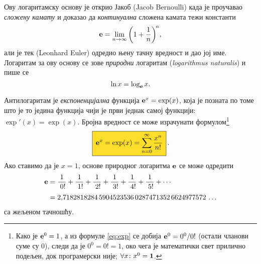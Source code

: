 Ову логаритамску основу је открио Јакоб  (Jacob Bernoulli) када је
проучавао {\sl сложену камату\/} и доказао да {\sl континуална\/} сложена камата
тежи константи
\begin{equation}\label{eq:elim}
\e=\lim_{n\to\infty}\left(1+\frac1n\right)^{\!n}\!,\index{лимес}
\end{equation}
али је тек  (Leonhard Euler)
одредио њену тачну вредност и дао јој име.
Логаритам за ову основу се зове
{\sl природни\/} логаритам ({\sl logarithmus naturalis\/})
и пише се
$$
\ln x=\log_{\bf e} x.
$$

\def\ep{\hphantom{!}}%
\def\rf#1!{\frac1{\hphantom{!}#1!}}%
Антилогаритам је {\sl експоненцијална\/} функција ${\bf e}^x=\exp(x)$, 
која је позната по томе што је то
једина функција чији је први
 једнак самој функцији: $\exp'(x)=\exp(x)$. 
Бројна вредност се може израчунати формулом\footnote{Како је ${\bf e}^0=1$, а из формуле \eqref{eq:exp} се добија
${\bf e}^0=0^0/0!$ (остали чланови суме су 0), следи да је $0^0=0!=1$, 
око чега је математички свет прилично подељен, док програмерски није; $\forall x\colon x^0={\bf1}$.}
\begin{equation}
\label{eq:exp}\index{формула}
\okvir{\e^x=\exp(x)=\sum_{n=0}^\infty\frac{x^n}{n!}}.
\end{equation}%
Ако ставимо да је $x=1$,
 основе природног логаритма ${\bf e}$ се може одредити
\begin{equation}\label{eq:e}
\begin{split}
\e
&=\rf0!+\rf1!+\rf2!+\rf3!+\rf4!+\rf5!+\cdots\\
\noalign{\smallskip}
&=2\.
7182818284\,
5904523536\,
0287471352\,
6624977572\,\ldots
\end{split}
\end{equation}
са жељеном тачношћу.
